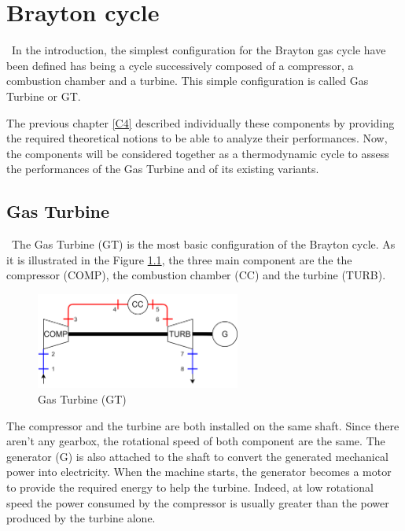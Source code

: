 \graphicspath{{Chapitre_5/Images/}}
\chapter{Brayton cycle}\label{C5}
\quad\, In the introduction, the simplest configuration for the Brayton gas cycle have been defined has being a cycle successively composed of a compressor, a combustion chamber and a turbine. This simple configuration is called Gas Turbine or GT. 

The previous chapter \ref{C4} described individually these components by providing the required theoretical notions to be able to analyze their performances. Now, the components will be considered together as a thermodynamic cycle to assess the performances of the Gas Turbine and of its existing variants.

\section{Gas Turbine}
\quad\, The Gas Turbine (GT) is the most basic configuration of the Brayton cycle. As it is illustrated in the Figure \ref{fig:C5_BraytonGT}, the three main component are the the compressor (COMP), the combustion chamber (CC) and the turbine (TURB).

\begin{figure}[h]
\centering
\includegraphics[width=0.6\textwidth] {GT}
\caption{Gas Turbine (GT)}
\label{fig:C5_BraytonGT}
\end{figure}

The compressor and the turbine are both installed on the same shaft. Since there aren't any gearbox, the rotational speed of both component are the same. The generator (G) is also attached to the shaft to convert the generated mechanical power into electricity. 
When the machine starts, the generator becomes a motor to provide the required energy to help the turbine. Indeed, at low rotational speed the power consumed by the compressor is usually greater than the power produced by the turbine alone. 



